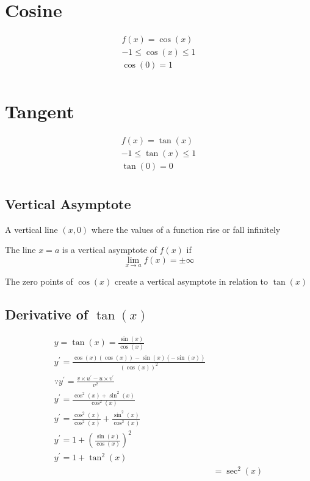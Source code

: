 \documentclass[12pt letter]{report}
\begin{document}
\section{Cosine}

\begin{align*}
	f(x) = \cos(x)                \\
	-1 \leq        \cos(x) \leq 1 \\
	\cos(0) = 1                   \\
\end{align*}

\section{Tangent}

\begin{align*}
	f(x) = \tan(x)                \\
	-1 \leq        \tan(x) \leq 1 \\
	\tan(0) = 0                   \\
\end{align*}

\subsection{Vertical Asymptote}

\begin{note}
	A vertical line $(x, 0)$ where the values of a function rise or fall infinitely
\end{note}

The line $x=a$ is a vertical asymptote of $f(x)$ if
\[
	\lim_{x \to a} f(x) = \pm \infty
\]

The zero points of $\cos(x)$ create a vertical asymptote in relation to $\tan(x)$

\subsection{Derivative of $\tan(x)$}


\begin{myproof}
	\begin{align*}
		y = \tan(x) = \frac{\sin(x)}{\cos(x)}                                       \\[20pt]
		y^{\prime} = \frac{\cos(x)(\cos(x))- \sin(x)(-\sin(x))}{(\cos(x))^2}        \\[20pt]
		\because y^{\prime} = \frac{v \times u^{\prime} - u \times v^{\prime}}{v^2} \\
		y^{\prime} = \frac{\cos^2(x) + \sin^2(x)}{\cos^2(x)}                        \\
		y^{\prime} = \frac{\cos^2(x)}{\cos^2(x)} + \frac{\sin^2(x)}{\cos^2(x)}      \\
		y^{\prime} = 1 + (\frac{\sin(x)}{\cos(x)})^2                                \\
		y^{\prime} = 1 + \tan^2(x)                                                  \\
		 & = \sec^2(x)
	\end{align*}
\end{myproof}
\end{document}
